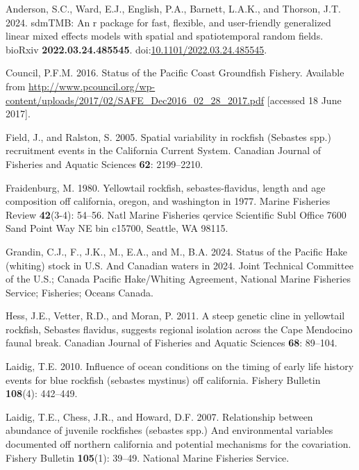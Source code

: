 \documentclass[
]{scrartcl}
\newlength{\cslhangindent}
\newlength{\cslentryspacingunit} %
\newenvironment{CSLReferences}[2] %
 {%
  \setlength{\parindent}{0pt}
  \ifodd #1
  \let\oldpar\par
  \def\par{\hangindent=\cslhangindent\oldpar}
  \fi
  \setlength{\parskip}{#2\cslentryspacingunit}
 }%
 {}
\begin{document}
\hypertarget{refs}{}
\begin{CSLReferences}{1}{0}
\leavevmode{}%
Anderson, S.C., Ward, E.J., English, P.A., Barnett, L.A.K., and Thorson,
J.T. 2024. sdmTMB: An r package for fast, flexible, and user-friendly
generalized linear mixed effects models with spatial and spatiotemporal
random fields. bioRxiv \textbf{2022.03.24.485545}.
doi:\href{https://doi.org/10.1101/2022.03.24.485545}{10.1101/2022.03.24.485545}.

\leavevmode{}%
Council, P.F.M. 2016. {Status of the Pacific Coast Groundfish Fishery}.
Available from
\url{http://www.pcouncil.org/wp-content/uploads/2017/02/SAFE_Dec2016_02_28_2017.pdf}
{[}accessed 18 June 2017{]}.

\leavevmode{}%
Field, J., and Ralston, S. 2005. {Spatial variability in rockfish
(Sebastes spp.) recruitment events in the California Current System}.
Canadian Journal of Fisheries and Aquatic Sciences \textbf{62}:
2199--2210.

\leavevmode{}%
Fraidenburg, M. 1980. Yellowtail rockfish, sebastes-flavidus, length and
age composition off california, oregon, and washington in 1977. Marine
Fisheries Review \textbf{42}(3-4): 54--56. Natl Marine Fisheries qervice
Scientific Subl Office 7600 Sand Point Way NE bin c15700, Seattle, WA
98115.

\leavevmode{}%
Grandin, C.J., F., J.K., M., E.A., and M., B.A. 2024. Status of the
{P}acific {H}ake (whiting) stock in {U}.{S}. And {C}anadian waters in
2024. Joint Technical Committee of the U.S.; Canada Pacific Hake/Whiting
Agreement, National Marine Fisheries Service; Fisheries; Oceans Canada.

\leavevmode{}%
Hess, J.E., Vetter, R.D., and Moran, P. 2011. {A steep genetic cline in
yellowtail rockfish, Sebastes flavidus, suggests regional isolation
across the Cape Mendocino faunal break}. Canadian Journal of Fisheries
and Aquatic Sciences \textbf{68}: 89--104.

\leavevmode{}%
Laidig, T.E. 2010. Influence of ocean conditions on the timing of early
life history events for blue rockfish (sebastes mystinus) off
california. Fishery Bulletin \textbf{108}(4): 442--449.

\leavevmode{}%
Laidig, T.E., Chess, J.R., and Howard, D.F. 2007. Relationship between
abundance of juvenile rockfishes (sebastes spp.) And environmental
variables documented off northern california and potential mechanisms
for the covariation. Fishery Bulletin \textbf{105}(1): 39--49. National
Marine Fisheries Service.


\end{CSLReferences}
\end{document}
